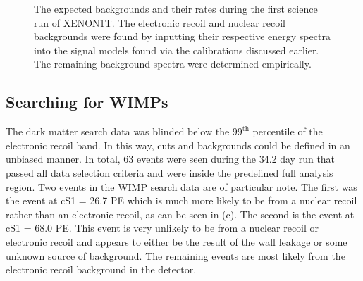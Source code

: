 \begin{figure}[p]
	 \hfill

        \caption{The expected backgrounds and their rates during the first science run of XENON1T.  The electronic recoil and nuclear recoil backgrounds were found by inputting their respective energy spectra into the signal models found via the calibrations discussed earlier.  The remaining background spectra were determined empirically.}
        \label{fig:xe1t_bkg_spectra}

\end{figure}


\subsection{Searching for WIMPs}

The dark matter search data was blinded below the $99^{\textrm{th}}$ percentile of the electronic recoil band.  In this way, cuts and backgrounds could be defined in an unbiased manner.  In total, 63 events were seen during the 34.2 day run that passed all data selection criteria and were inside the predefined full analysis region.  Two events in the WIMP search data are of particular note.  The first was the event at cS1 = 26.7 PE which is much more likely to be from a nuclear recoil rather than an electronic recoil, as can be seen in (c).  The second is the event at cS1 = 68.0 PE.  This event is very unlikely to be from a nuclear recoil or electronic recoil and appears to either be the result of the wall leakage or some unknown source of background.  The remaining events are most likely from the electronic recoil background in the detector.


